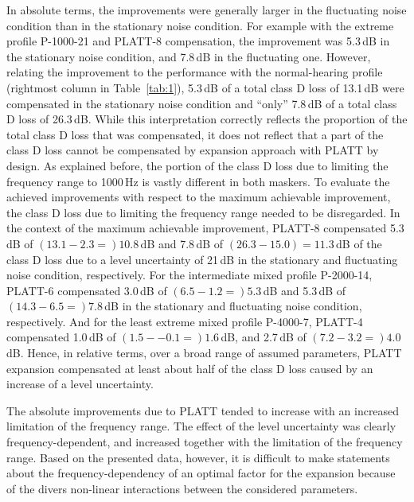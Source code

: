 \documentclass[10pt,a4paper,twocolumn]{article}
\begin{document}
In absolute terms, the improvements were generally larger in the fluctuating noise condition than in the stationary noise condition.
%
For example with the extreme profile P-1000-21 and PLATT-8 compensation, the improvement was 5.3\,dB in the stationary noise condition, and 7.8\,dB in the fluctuating one.
%
However, relating the improvement to the performance with the normal-hearing profile (rightmost column in Table~\ref{tab:1}), 5.3\,dB of a total class D loss of 13.1\,dB were compensated in the stationary noise condition and \enquote{only} 7.8\,dB of a total class D loss of 26.3\,dB.
%
While this interpretation correctly reflects the proportion of the total class D loss that was compensated, it does not reflect that a part of the class D loss cannot be compensated by expansion approach with PLATT by design. 
%
As explained before, the portion of the class D loss due to limiting the frequency range to 1000\,Hz is vastly different in both maskers.
%
To evaluate the achieved improvements with respect to the maximum achievable improvement, the class D loss due to limiting the frequency range needed to be disregarded.
%
In the context of the maximum achievable improvement, PLATT-8 compensated 5.3\,dB of $(13.1-2.3=)10.8$\,dB and 7.8\,dB of $(26.3-15.0)=11.3$\,dB of the class D loss due to a level uncertainty of 21\,dB in the stationary and fluctuating noise condition, respectively.
%
For the intermediate mixed profile P-2000-14, PLATT-6 compensated 3.0\,dB of $(6.5-1.2=)5.3$\,dB and 5.3\,dB of $(14.3-6.5=)7.8$\,dB in the stationary and fluctuating noise condition, respectively.
%
And for the least extreme mixed profile P-4000-7, PLATT-4 compensated 1.0\,dB of $(1.5-{-0.1}=)1.6$\,dB, and 2.7\,dB of $(7.2-3.2=)4.0$\,dB.
%
Hence, in relative terms, over a broad range of assumed parameters, PLATT expansion compensated at least about half of the class D loss caused by an increase of a level uncertainty.

The absolute improvements due to PLATT tended to increase with an increased limitation of the frequency range.
%
The effect of the level uncertainty was clearly frequency-dependent, and increased together with the limitation of the frequency range.
%
Based on the presented data, however, it is difficult to make statements about the frequency-dependency of an optimal factor for the expansion because of the divers non-linear interactions between the considered parameters.
\end{document}
